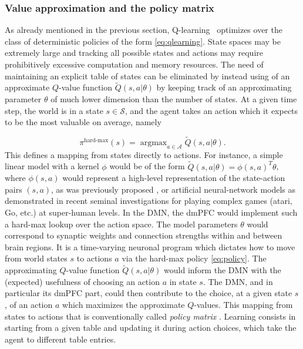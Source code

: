 \documentclass[10pt,letterpaper]{article}
\DeclareMathOperator{\argmax}{argmax}
\begin{document}
\subsubsection{Value approximation and the policy matrix}
\label{sec:policymat}
As already mentioned in the previous section, Q-learning~\citep{watkins92} optimizes over the class of
deterministic policies of the form \eqref{eq:qlearning}. State spaces may be extremely large
and tracking all possible states and actions may require prohibitively excessive
computation and memory resources.
The need of maintaining an explicit table of
states can be eliminated by instead using of an approximate $Q$-value function $\tilde{Q}(s,a|\theta)$
by keeping track of an approximating parameter $\theta$ of much lower dimension than the number of states.
At a given time step, the world is in a state $s \in \mathcal S$, and the agent takes an
action which it expects to be the most valuable on average, namely

\begin{equation}
  \pi^{\text{hard-max}}(s) = \argmax_{a \in \mathcal A}\tilde{Q}(s, a|\theta).
  \label{eq:policy}
\end{equation}
This defines a mapping from states directly to actions.
For instance, a simple linear model with a kernel $\phi$ would be of the
form $\tilde{Q}(s, a|\theta) = \phi(s,a)^T\theta$, where
$\phi(s,a)$ would represent a high-level representation of the state-action pairs
$(s,a)$, as was previously proposed \citep{songNIPS2016},
or artificial neural-network models as demonstrated in recent
seminal investigations
\citep{mnih2015,silver2016mastering} for playing complex games (atari, Go, etc.) at super-human levels.
In the DMN, the dmPFC would implement such a hard-max lookup
over the action space.
The model
parameters $\theta$ would correspond to synaptic weights and connection strengths within and between
brain regions. It is a time-varying neuronal program which dictates how to move from world states $s$ to actions $a$ via the hard-max policy \eqref{eq:policy}.
The approximating $Q$-value function $\tilde{Q}(s, a|\theta)$ would inform the DMN with the (expected) usefulness of choosing an action $a$ in state $s$.
The DMN, and in particular its dmPFC part, could then contribute to the choice, at a given state $s$, of an action $a$ which maximizes the approximate
$Q$-values.
This mapping from states to actions that is conventionally called
\textit{policy matrix} \citep{mnih2015,silver2016mastering}.
Learning consists in starting from a given table and
updating it during action choices,
which take the agent to different table entries.
\end{document}
